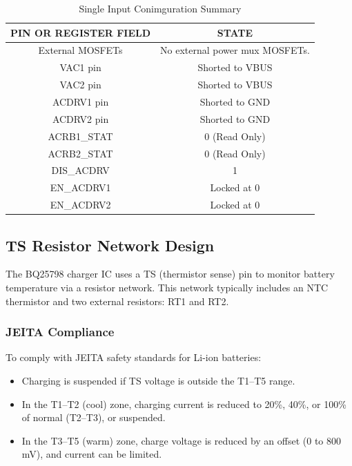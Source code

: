 \documentclass[12pt]{article}
\begin{document}
\begin{table}[H]
    \centering
    \begin{tabular}{|c|c|}
        \hline
        \rowcolor{headerbg}
        \textcolor{headerfg}{\textbf{PIN OR REGISTER FIELD}} &
        \textcolor{headerfg}{\textbf{STATE}} \\
        \hline
        External MOSFETs & No external power mux MOSFETs. \\
        VAC1 pin & Shorted to VBUS \\
        VAC2 pin & Shorted to VBUS \\
        ACDRV1 pin & Shorted to GND \\
        ACDRV2 pin & Shorted to GND \\
        ACRB1\_STAT & 0 (Read Only) \\
        ACRB2\_STAT & 0 (Read Only) \\
        DIS\_ACDRV & 1 \\
        EN\_ACDRV1 & Locked at 0 \\
        EN\_ACDRV2 & Locked at 0 \\
        \hline
    \end{tabular}
    \caption{Single Input Conimguration Summary}
    \label{tab:single_input_conimg_summary}
\end{table}

\subsection{TS Resistor Network Design}
The BQ25798 charger IC uses a TS (thermistor sense) pin to monitor battery temperature via a resistor network. This network typically includes an NTC thermistor and two external resistors: RT1 and RT2.
\subsubsection*{JEITA Compliance}
To comply with JEITA safety standards for Li-ion batteries:
\begin{itemize}
    \item Charging is suspended if TS voltage is outside the T1–T5 range.
    \item In the T1–T2 (cool) zone, charging current is reduced to 20\%, 40\%, or 100\% of normal (T2–T3), or suspended.
    \item In the T3–T5 (warm) zone, charge voltage is reduced by an offset (0 to 800\,mV), and current can be limited.
\end{itemize}
\end{document}
